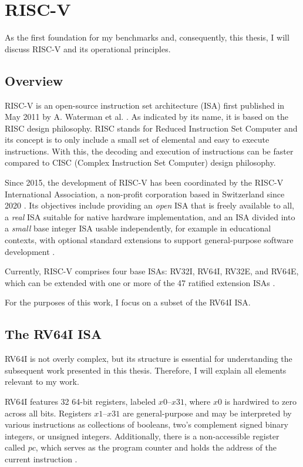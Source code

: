 \chapter{RISC-V}\label{chap:riscv}

As the first foundation for my benchmarks and, consequently, this
thesis, I will discuss RISC-V and its operational principles.

\section{Overview}

RISC-V is an open-source instruction set architecture (ISA) first
published in May 2011 by A. Waterman et al. \cite{first_riscv}. As
indicated by its name, it is based on the RISC design philosophy.
RISC stands for Reduced Instruction Set Computer and its concept is
to only include a small set of elemental and easy to execute
instructions. With this, the decoding and execution of instructions
can be faster compared to CISC (Complex Instruction Set Computer)
design philosophy.

Since 2015, the development of RISC-V has been coordinated by the
RISC-V International Association, a non-profit corporation based in
Switzerland since 2020 \cite{riscvorg}. Its objectives include
providing an \emph{open} ISA that is freely available to all, a
\emph{real} ISA suitable for native hardware implementation, and an
ISA divided into a \emph{small} base integer ISA usable
independently, for example in educational contexts, with optional
standard extensions to support general-purpose software development
\cite[Chapter 1]{riscv-isa}.

Currently, RISC-V comprises four base ISAs: RV32I, RV64I, RV32E, and
RV64E, which can be extended with one or more of the 47 ratified
extension ISAs \cite[Preface]{riscv-isa}.

For the purposes of this work, I focus on a subset of the RV64I ISA.

\section{The RV64I ISA} \label{sec:riscvIsa}
RV64I is not overly complex, but its structure is essential for
understanding the subsequent work presented in this thesis.
Therefore, I will explain all elements relevant to my work.

RV64I features 32 64-bit registers, labeled $x0$–$x31$, where $x0$ is
hardwired to zero across all bits. Registers $x1$–$x31$ are
general-purpose and may be interpreted by various instructions as
collections of booleans, two's complement signed binary integers, or
unsigned integers. Additionally, there is a non-accessible register
called $pc$, which serves as the program counter and holds the
address of the current instruction \cite[Chapters 4.1,
      2.1]{riscv-isa}.

